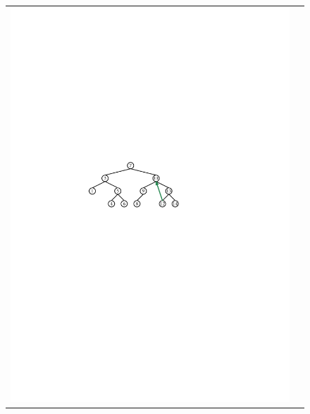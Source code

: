 \begin{figure}
  \begin{center}
    \begin{tabular}{cc}
    \includegraphics[width=\HalfScaleIfNeeded]{figs/bst-delete-1}

\end{tabular}
\end{center}
\end{figure}
